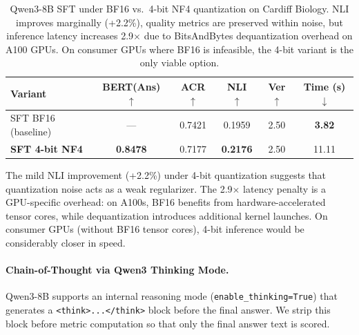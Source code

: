 \begin{table}[h]
\centering
\small
\begin{tabular}{l|c|c|c|c|c}
\toprule
Variant & BERT(Ans) $\uparrow$ & ACR $\uparrow$ & NLI $\uparrow$ & Ver $\uparrow$ & Time (s) $\downarrow$ \\
\midrule
SFT BF16 (baseline) & --- & 0.7421 & 0.1959 & 2.50 & \textbf{3.82} \\
\textbf{SFT 4-bit NF4} & \textbf{0.8478} & 0.7177 & \textbf{0.2176} & 2.50 & 11.11 \\
\bottomrule
\end{tabular}
\caption{Qwen3-8B SFT under BF16 vs.\ 4-bit NF4 quantization on Cardiff Biology. NLI improves marginally (+2.2\%), quality metrics are preserved within noise, but inference latency increases 2.9$\times$ due to BitsAndBytes dequantization overhead on A100 GPUs. On consumer GPUs where BF16 is infeasible, the 4-bit variant is the only viable option.}
\label{tab:quantization}
\end{table}

The mild NLI improvement (+2.2\%) under 4-bit quantization suggests that quantization noise acts as a weak regularizer. The 2.9$\times$ latency penalty is a GPU-specific overhead: on A100s, BF16 benefits from hardware-accelerated tensor cores, while dequantization introduces additional kernel launches. On consumer GPUs (without BF16 tensor cores), 4-bit inference would be considerably closer in speed.

\paragraph{Chain-of-Thought via Qwen3 Thinking Mode.}
Qwen3-8B supports an internal reasoning mode (\texttt{enable\_thinking=True}) that generates a \texttt{<think>...</think>} block before the final answer. We strip this block before metric computation so that only the final answer text is scored.

